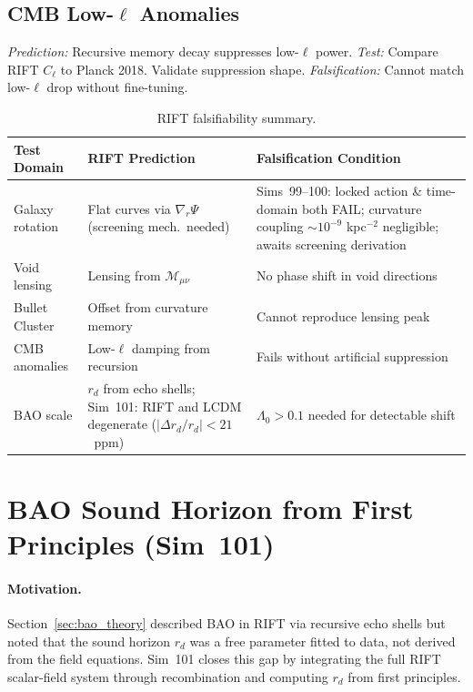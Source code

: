 \documentclass[12pt,a4paper]{article}
\begin{document}
\subsection{CMB Low-\texorpdfstring{$\ell$}{ell} Anomalies}
\emph{Prediction:} Recursive memory decay suppresses low-$\ell$ power.
\emph{Test:} Compare RIFT $C_\ell$ to Planck 2018. Validate suppression shape.
\emph{Falsification:} Cannot match low-$\ell$ drop without fine-tuning.

\begin{table}[ht]
\centering
\caption{RIFT falsifiability summary.}
\begin{tabular}{lll}
\toprule
Test Domain & RIFT Prediction & Falsification Condition \\
\midrule
Galaxy rotation & Flat curves via $\nabla_r\Psi$ (screening mech.\ needed) & Sims~99--100: locked action \& time-domain both FAIL; curvature coupling $\sim10^{-9}$ kpc$^{-2}$ negligible; awaits screening derivation \\
Void lensing & Lensing from $\mathcal{M}_{\mu\nu}$ & No phase shift in void directions \\
Bullet Cluster & Offset from curvature memory & Cannot reproduce lensing peak \\
CMB anomalies & Low-$\ell$ damping from recursion & Fails without artificial suppression \\
BAO scale & $r_d$ from echo shells; Sim~101: RIFT and LCDM degenerate ($|\Delta r_d/r_d|<21$~ppm) & $\Lambda_0>0.1$ needed for detectable shift \\
\bottomrule
\end{tabular}
\end{table}

\section{BAO Sound Horizon from First Principles (Sim~101)}
\label{sec:sim101}

\paragraph{Motivation.}
Section~\ref{sec:bao_theory} described BAO in RIFT via recursive echo shells but
noted that the sound horizon $r_d$ was a free parameter fitted to data, not
derived from the field equations. Sim~101 closes this gap by integrating the
full RIFT scalar-field system through recombination and computing $r_d$
from first principles.
\end{document}
